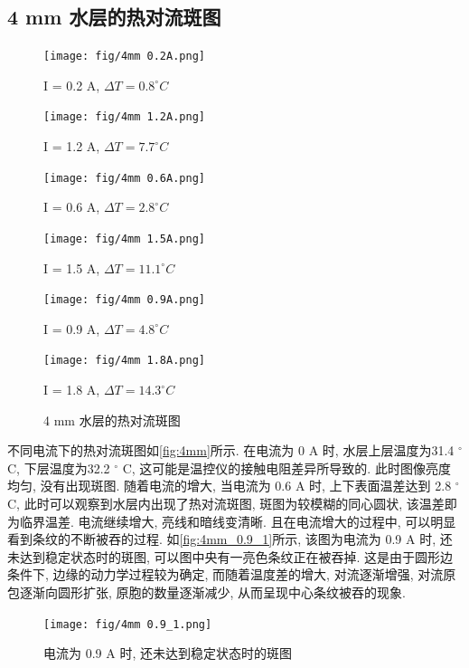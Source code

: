 \documentclass[font=default]{mpltx}
\begin{document}
  \subsection{4 mm 水层的热对流斑图}
  \begin{figure}[htbp]      
    \caption{4 mm 水层的热对流斑图}
    \begin{minipage}{0.32\linewidth}
      \vspace{3pt}
      \centerline{\texttt{[image: fig/4mm 0.2A.png]}}
      \centerline{I = 0.2 A, $\Delta T = 0.8^\circ C$}
      \vspace{3pt}
      \centerline{\texttt{[image: fig/4mm 1.2A.png]}}
      \centerline{I = 1.2 A, $\Delta T = 7.7^\circ C$}
    \end{minipage}
    \begin{minipage}{0.32\linewidth}
      \vspace{3pt}
      \centerline{\texttt{[image: fig/4mm 0.6A.png]}}
      \centerline{I = 0.6 A, $\Delta T = 2.8^\circ C$}
      \vspace{3pt}
      \centerline{\texttt{[image: fig/4mm 1.5A.png]}}
      \centerline{I = 1.5 A, $\Delta T = 11.1^\circ C$}
    \end{minipage}
    \begin{minipage}{0.32\linewidth}
      \vspace{3pt}
      \centerline{\texttt{[image: fig/4mm 0.9A.png]}}
      \centerline{I = 0.9 A, $\Delta T = 4.8^\circ C$}
      \vspace{3pt}
      \centerline{\texttt{[image: fig/4mm 1.8A.png]}}
      \centerline{I = 1.8 A, $\Delta T = 14.3^\circ C$}
    \end{minipage}
    \label{fig:4mm}
  \end{figure}
  不同电流下的热对流斑图如\autoref{fig:4mm}所示.
  在电流为 0 A 时, 水层上层温度为31.4 $^\circ$ C, 下层温度为32.2 $^\circ$ C, 这可能是温控仪的接触电阻差异所导致的. 此时图像亮度均匀, 没有出现斑图.
  随着电流的增大, 当电流为 0.6 A 时, 上下表面温差达到 2.8 $^\circ$ C, 此时可以观察到水层内出现了热对流斑图, 斑图为较模糊的同心圆状, 该温差即为临界温差.
  电流继续增大, 亮线和暗线变清晰.
  且在电流增大的过程中, 可以明显看到条纹的不断被吞的过程. 如\autoref{fig:4mm_0.9_1}所示, 该图为电流为 0.9 A 时, 还未达到稳定状态时的斑图, 
  可以图中央有一亮色条纹正在被吞掉. 这是由于圆形边条件下, 边缘的动力学过程较为确定, 而随着温度差的增大, 对流逐渐增强, 对流原包逐渐向圆形扩张, 原胞的数量逐渐减少,
  从而呈现中心条纹被吞的现象.

  \begin{figure}[htbp]
    \centering
    \texttt{[image: fig/4mm 0.9\_1.png]}
    \caption{电流为 0.9 A 时, 还未达到稳定状态时的斑图}
    \label{fig:4mm_0.9_1}
  \end{figure}
\end{document}

